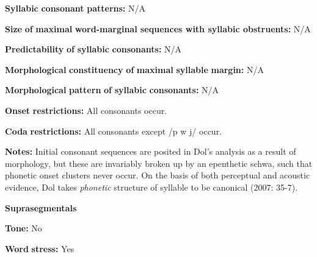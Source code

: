 \begin{styleBody}
\textbf{Syllabic} \textbf{consonant} \textbf{patterns:} N/A
\end{styleBody}

\begin{styleBody}
\textbf{Size} \textbf{of} \textbf{maximal} \textbf{word{}-marginal sequences with syllabic obstruents:} N/A
\end{styleBody}

\begin{styleBody}
\textbf{Predictability} \textbf{of} \textbf{syllabic} \textbf{consonants:} N/A
\end{styleBody}

\begin{styleBody}
\textbf{Morphological} \textbf{constituency} \textbf{of} \textbf{maximal} \textbf{syllable} \textbf{margin:} N/A
\end{styleBody}

\begin{styleBody}
\textbf{Morphological} \textbf{pattern} \textbf{of} \textbf{syllabic} \textbf{consonants:} N/A
\end{styleBody}

\begin{styleBody}
\textbf{Onset} \textbf{restrictions:} All consonants occur.
\end{styleBody}

\begin{styleBody}
\textbf{Coda} \textbf{restrictions:} All consonants except /p w j/ occur.
\end{styleBody}

\begin{styleBody}
\textbf{Notes:} Initial consonant sequences are posited in Dol’s analysis as a result of morphology, but these are invariably broken up by an epenthetic schwa, such that phonetic onset clusters never occur. On the basis of both perceptual and acoustic evidence, Dol takes \textit{phonetic} structure of syllable to be canonical (2007: 35-7).
\end{styleBody}

\begin{styleBody}
\textbf{Suprasegmentals}
\end{styleBody}

\begin{styleBody}
\textbf{Tone:} No
\end{styleBody}

\begin{styleBody}
\textbf{Word} \textbf{stress:} Yes
\end{styleBody}

